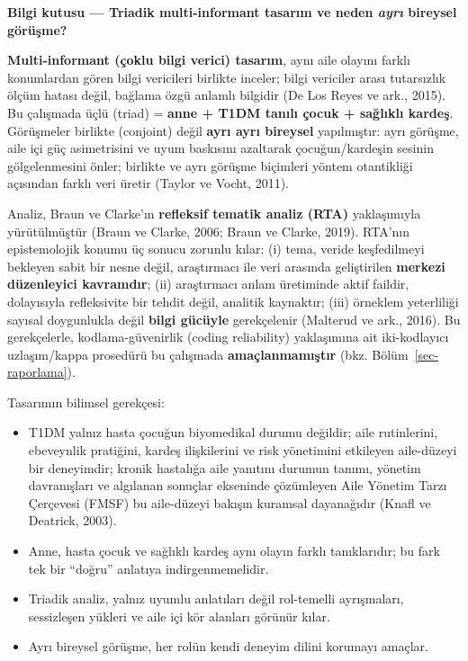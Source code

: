 \documentclass[
  turkish,
  a4paper,
  DIV=11,
  numbers=noendperiod]{scrreprt}
\providecommand{\tightlist}{%
  \setlength{\itemsep}{0pt}\setlength{\parskip}{0pt}}
\begin{document}
\begin{tcolorbox}[enhanced jigsaw, arc=.35mm, bottomrule=.15mm, bottomtitle=1mm, breakable, colback=white, colbacktitle=quarto-callout-note-color!10!white, colframe=quarto-callout-note-color-frame, coltitle=black, left=2mm, leftrule=.75mm, opacityback=0, opacitybacktitle=0.6, rightrule=.15mm, title=\textcolor{quarto-callout-note-color}{\faInfo}\hspace{0.5em}{Not}, titlerule=0mm, toprule=.15mm, toptitle=1mm]

\textbf{Bilgi kutusu --- Triadik multi-informant tasarım ve neden
\emph{ayrı} bireysel görüşme?}

\textbf{Multi-informant (çoklu bilgi verici) tasarım}, aynı aile olayını
farklı konumlardan gören bilgi vericileri birlikte inceler; bilgi
vericiler arası tutarsızlık ölçüm hatası değil, bağlama özgü anlamlı
bilgidir (De Los Reyes ve ark., 2015). Bu çalışmada üçlü (triad) =
\textbf{anne + T1DM tanılı çocuk + sağlıklı kardeş}. Görüşmeler birlikte
(conjoint) değil \textbf{ayrı ayrı bireysel} yapılmıştır: ayrı görüşme,
aile içi güç asimetrisini ve uyum baskısını azaltarak çocuğun/kardeşin
sesinin gölgelenmesini önler; birlikte ve ayrı görüşme biçimleri yöntem
otantikliği açısından farklı veri üretir (Taylor ve Vocht, 2011).

\end{tcolorbox}

Analiz, Braun ve Clarke'ın \textbf{refleksif tematik analiz (RTA)}
yaklaşımıyla yürütülmüştür (Braun ve Clarke, 2006; Braun ve Clarke,
2019). RTA'nın epistemolojik konumu üç sonucu zorunlu kılar: (i) tema,
veride keşfedilmeyi bekleyen sabit bir nesne değil, araştırmacı ile veri
arasında geliştirilen \textbf{merkezi düzenleyici kavramdır}; (ii)
araştırmacı anlam üretiminde aktif faildir, dolayısıyla refleksivite bir
tehdit değil, analitik kaynaktır; (iii) örneklem yeterliliği sayısal
doygunlukla değil \textbf{bilgi gücüyle} gerekçelenir (Malterud ve ark.,
2016). Bu gerekçelerle, kodlama-güvenirlik (coding reliability)
yaklaşımına ait iki-kodlayıcı uzlaşım/kappa prosedürü bu çalışmada
\textbf{amaçlanmamıştır} (bkz. Bölüm~\ref{sec-raporlama}).

Tasarımın bilimsel gerekçesi:

\begin{itemize}
\tightlist
\item
  T1DM yalnız hasta çocuğun biyomedikal durumu değildir; aile
  rutinlerini, ebeveynlik pratiğini, kardeş ilişkilerini ve risk
  yönetimini etkileyen aile-düzeyi bir deneyimdir; kronik hastalığa aile
  yanıtını durumun tanımı, yönetim davranışları ve algılanan sonuçlar
  ekseninde çözümleyen Aile Yönetim Tarzı Çerçevesi (FMSF) bu
  aile-düzeyi bakışın kuramsal dayanağıdır (Knafl ve Deatrick, 2003).
\item
  Anne, hasta çocuk ve sağlıklı kardeş aynı olayın farklı tanıklarıdır;
  bu fark tek bir ``doğru'' anlatıya indirgenmemelidir.
\item
  Triadik analiz, yalnız uyumlu anlatıları değil rol-temelli
  ayrışmaları, sessizleşen yükleri ve aile içi kör alanları görünür
  kılar.
\item
  Ayrı bireysel görüşme, her rolün kendi deneyim dilini korumayı
  amaçlar.
\end{itemize}
\end{document}
